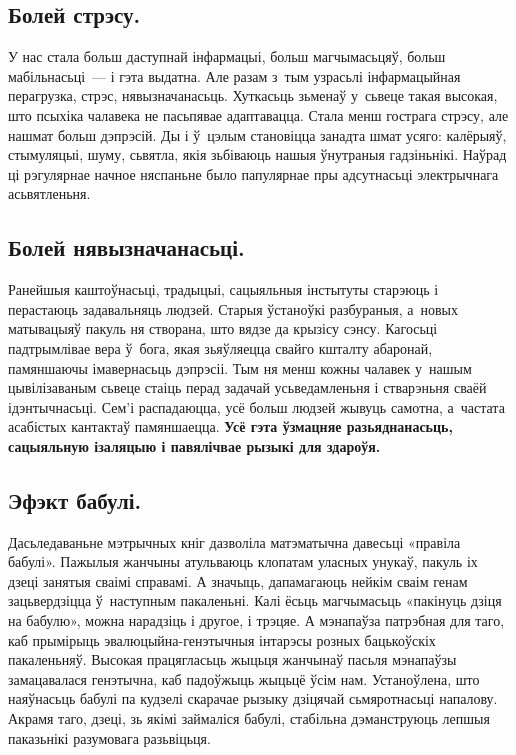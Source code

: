 \subsection*{Болей стрэсу.}

У нас стала больш даступнай інфармацыі, больш магчымасьцяў, больш мабільнасьці~--- і гэта выдатна. Але разам з~тым узрасьлі інфармацыйная перагрузка, стрэс, нявызначанасьць. Хуткасьць зьменаў у~сьвеце такая высокая, што псыхіка чалавека не пасьпявае адаптавацца. Стала менш гострага стрэсу, але нашмат больш дэпрэсій. Ды і ў~цэлым становіцца занадта шмат усяго: калёрыяў, стымуляцыі, шуму, сьвятла, якія зьбіваюць нашыя ўнутраныя гадзіньнікі. Наўрад ці рэгулярнае начное няспаньне было папулярнае пры адсутнасьці электрычнага асьвятленьня.

\subsection*{Болей нявызначанасьці.}

Ранейшыя каштоўнасьці, традыцыі, сацыяльныя інстытуты старэюць і перастаюць задавальняць людзей. Старыя ўстаноўкі разбураныя, а~новых матывацыяў пакуль ня створана, што вядзе да крызісу сэнсу. Кагосьці падтрымлівае вера ў~бога, якая зьяўляецца свайго кшталту абаронай, памяншаючы імавернасьць дэпрэсіі. Тым ня менш кожны чалавек у~нашым цывілізаваным сьвеце стаіць перад задачай усьведамленьня і стварэньня сваёй ідэнтычнасьці. Сем'і распадаюцца, усё больш людзей жывуць самотна, а~частата асабістых кантактаў памяншаецца. \textbf{Усё гэта ўзмацняе разьяднанасьць, сацыяльную ізаляцыю і павялічвае рызыкі для здароўя.}

\subsection*{Эфэкт бабулі.}

Дасьледаваньне мэтрычных кніг дазволіла матэматычна давесьці «правіла бабулі». Пажылыя жанчыны атульваюць клопатам уласных унукаў, пакуль іх дзеці занятыя сваімі справамі. А значыць, дапамагаюць нейкім сваім генам зацьвердзіцца ў~наступным пакаленьні. Калі ёсьць магчымасьць «пакінуць дзіця на бабулю», можна нарадзіць і другое, і трэцяе. А мэнапаўза патрэбная для таго, каб прымірыць эвалюцыйна-генэтычныя інтарэсы розных бацькоўскіх пакаленьняў. Высокая працягласьць жыцьця жанчынаў пасьля мэнапаўзы замацавалася генэтычна, каб падоўжыць жыцьцё ўсім нам. Устаноўлена, што наяўнасьць бабулі па кудзелі скарачае рызыку дзіцячай сьмяротнасьці напалову. Акрамя таго, дзеці, зь якімі займаліся бабулі, стабільна дэманструюць лепшыя паказьнікі разумовага разьвіцьця.

